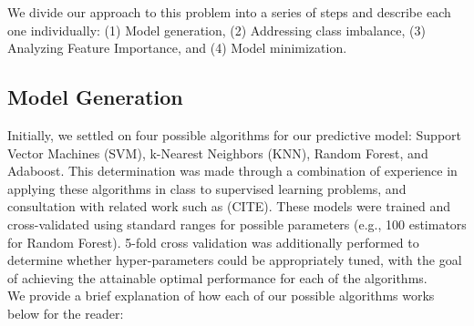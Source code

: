 \documentclass[conference]{IEEEtran}
\begin{document}
We divide our approach to this problem into a series of steps and describe each one individually: (1) Model generation, (2) 
Addressing class imbalance, (3) Analyzing Feature Importance, and (4) Model minimization.

\subsection{Model Generation}

Initially, we settled on four possible algorithms for our predictive model: Support Vector Machines (SVM), k-Nearest Neighbors (KNN), 
Random Forest, and Adaboost. This determination was made through a combination of experience in applying these algorithms in class
to supervised learning problems, and consultation with related work such as (CITE). These models were trained and cross-validated using 
standard ranges for possible parameters (e.g., 100 estimators for Random Forest). 5-fold cross validation was additionally performed to determine
whether hyper-parameters could be appropriately tuned, with the goal of achieving the attainable optimal performance for each of the algorithms.\\

We provide a brief explanation of how each of our possible algorithms works below for the reader:
\end{document}
